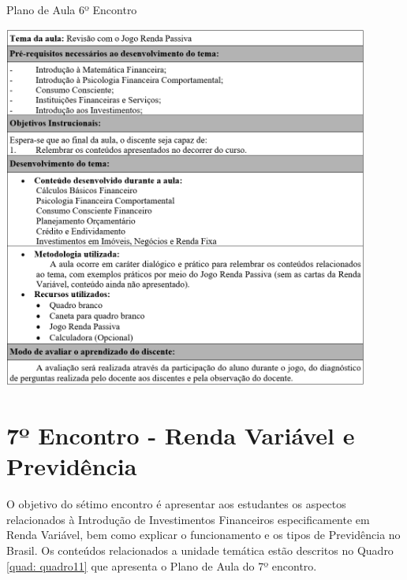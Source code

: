 \graphicspath{{quadros/}} 
\begin{quadro}[!ht]
\centering
\begin{minipage}{1.\textwidth}
\caption{Plano de Aula 6º Encontro}
\centering
\includegraphics[width=0.9\textwidth]{quadro-10_plano-aula-6}
\label{quad: quadro10}
\end{minipage}
\end{quadro}

\section{7º Encontro - Renda Variável e Previdência}
O objetivo do sétimo encontro é apresentar aos estudantes os aspectos relacionados à Introdução de Investimentos Financeiros especificamente em Renda Variável, bem como explicar o funcionamento e os tipos de Previdência no Brasil. Os conteúdos relacionados a unidade temática estão descritos no Quadro \ref{quad: quadro11} que apresenta o Plano de Aula do 7º encontro.

